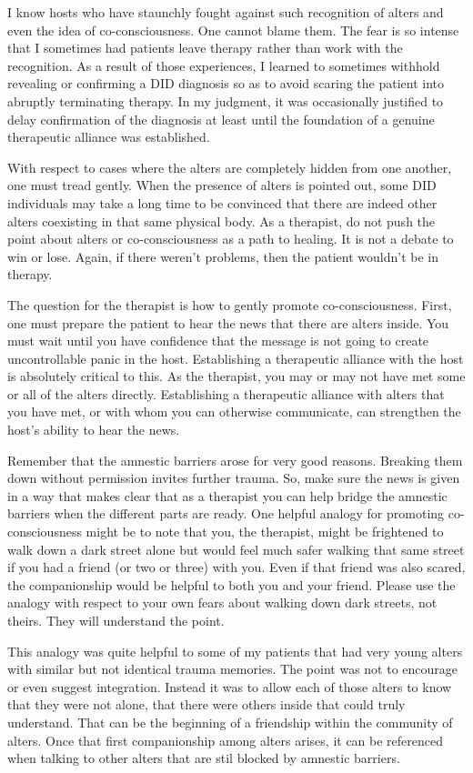 \documentclass[]{book}
\begin{document}
I know hosts who have staunchly fought against such recognition of alters and even the idea of co-consciousness. One cannot blame them. The fear is so intense that I sometimes had patients leave therapy rather than work with the recognition. As a result of those experiences, I learned to sometimes withhold revealing or confirming a DID diagnosis so as to avoid scaring the patient into abruptly terminating therapy. In my judgment, it was occasionally justified to delay confirmation of the diagnosis at least until the foundation of a genuine therapeutic alliance was established.

With respect to cases where the alters are completely hidden from one another, one must tread gently. When the presence of alters is pointed out, some DID individuals may take a long time to be convinced that there are indeed other alters coexisting in that same physical body. As a therapist, do not push the point about alters or co-consciousness as a path to healing. It is not a debate to win or lose. Again, if there weren't problems, then the patient wouldn't be in therapy.

The question for the therapist is how to gently promote co-consciousness. First, one must prepare the patient to hear the news that there are alters inside. You must wait until you have confidence that the message is not going to create uncontrollable panic in the host. Establishing a therapeutic alliance with the host is absolutely critical to this. As the therapist, you may or may not have met some or all of the alters directly. Establishing a therapeutic alliance with alters that you have met, or with whom you can otherwise communicate, can strengthen the host's ability to hear the news.

Remember that the amnestic barriers arose for very good reasons. Breaking them down without permission invites further trauma. So, make sure the news is given in a way that makes clear that as a therapist you can help bridge the amnestic barriers when the different parts are ready. One helpful analogy for promoting co-consciousness might be to note that you, the therapist, might be frightened to walk down a dark street alone but would feel much safer walking that same street if you had a friend (or two or three) with you. Even if that friend was also scared, the companionship would be helpful to both you and your friend. Please use the analogy with respect to your own fears about walking down dark streets, not theirs. They will understand the point.

This analogy was quite helpful to some of my patients that had very young alters with similar but not identical trauma memories. The point was not to encourage or even suggest integration. Instead it was to allow each of those alters to know that they were not alone, that there were others inside that could truly understand. That can be the beginning of a friendship within the community of alters. Once that first companionship among alters arises, it can be referenced when talking to other alters that are stil blocked by amnestic barriers.
\end{document}
